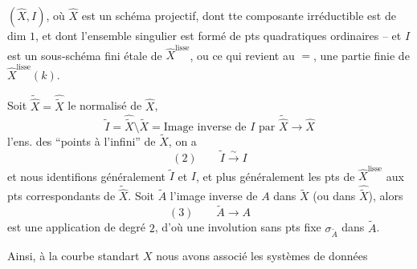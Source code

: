 $(\widehat X,I)$, où $\widehat X$ est un schéma projectif, dont tte composante irréductible est de dim $1$, et dont l'ensemble singulier est formé de pts quadratiques ordinaires -- et $I$ est un sous-schéma fini étale de $\widehat X^{\mathrm{lisse}}$, ou ce qui revient au $=$, une partie finie de $\widehat X^{\mathrm{lisse}}(k)$.

Soit $\widetilde{\widehat X}=\widehat{\widetilde X}$ le normalisé de $\widehat X$, 
\[
\widetilde I=\widehat{\widetilde X}\setminus\widetilde X
=\text{Image inverse de }I\text{ par }\widetilde{\widehat X}\to\widehat X
\]
l'ens. des  ``points à l'infini'' de $\widetilde X$, on a
\[
(2)\qquad\widetilde I\xrightarrow{\sim}I
\]
et nous identifions généralement $\widetilde I$ et $I$, et plus généralement  les pts de $\widehat X^{\mathrm{lisse}}$ aux pts correspondants de $\widetilde{\widehat X}$. Soit $\widetilde A$ l'image inverse de $A$ dans $\widetilde X$ (ou dans $\widehat{\widetilde X}$), alors
\[
(3)\qquad\widetilde A\longrightarrow A
\]
est une application de degré $2$, d'où une involution sans pts fixe $\sigma_{\widetilde A}$ dans $\widetilde A$.

Ainsi, à la courbe standart $X$ nous avons associé les systèmes de données
